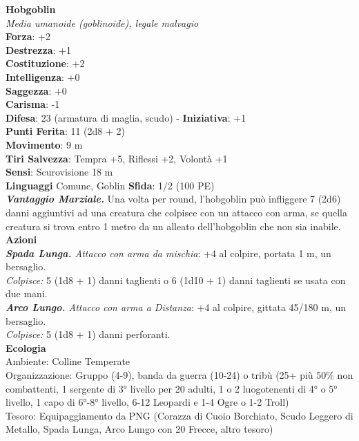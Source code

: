 \begin{multicols}{2}
\medskip\textbf{Hobgoblin}\\
\emph{Media umanoide (goblinoide), legale malvagio}\\
\textbf{Forza}: +2\\
\textbf{Destrezza}: +1\\
\textbf{Costituzione}: +2\\
\textbf{Intelligenza}: +0\\
\textbf{Saggezza}: +0\\
\textbf{Carisma}: -1\\
\textbf{Difesa}: 23 (armatura di maglia, scudo) - \textbf{Iniziativa}: +1\\
\textbf{Punti Ferita}: 11 (2d8 + 2)\\
\textbf{Movimento}: 9 m\\
\textbf{Tiri Salvezza}: Tempra +5, Riflessi +2, Volontà +1\\
\textbf{Sensi}: Scurovisione 18 m\\
\textbf{Linguaggi} Comune, Goblin \textbf{Sfida}: 1/2 (100 PE)\smallskip\\
\emph{\textbf{Vantaggio Marziale.}} Una volta per round, l'hobgoblin può infliggere 7 (2d6) danni aggiuntivi ad una creatura che colpisce con un attacco con arma, se quella creatura si trova entro 1 metro da un alleato dell'hobgoblin che non sia inabile.\\
\smallskip\textbf{Azioni}\\
\emph{\textbf{Spada Lunga.} Attacco con arma da mischia}: +4 al colpire, portata 1 m, un bersaglio.\\
\emph{Colpisce:} 5 (1d8 + 1) danni taglienti o 6 (1d10 + 1) danni taglienti se usata con due mani.\\
\emph{\textbf{Arco Lungo.} Attacco con arma a Distanza}: +4 al colpire, gittata 45/180 m, un bersaglio.\\
\emph{Colpisce:} 5 (1d8 + 1) danni perforanti.\\
\textbf{Ecologia}\\
Ambiente: Colline Temperate\\
Organizzazione: Gruppo (4-9), banda da guerra (10-24) o tribù (25+ più 50\% non combattenti, 1 sergente di 3° livello per 20 adulti, 1 o 2 luogotenenti di 4° o 5° livello, 1 capo di 6°-8° livello, 6-12 Leopardi e 1-4 Ogre o 1-2 Troll)\\
Tesoro: Equipaggiamento da PNG (Corazza di Cuoio Borchiato, Scudo Leggero di Metallo, Spada Lunga, Arco Lungo con 20 Frecce, altro tesoro)\\

\end{multicols}
